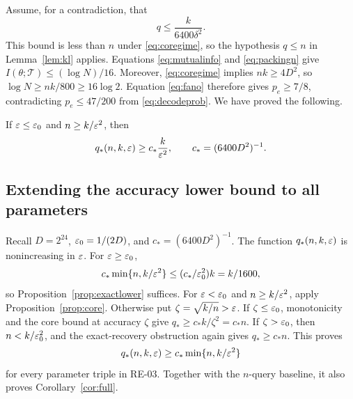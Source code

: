 Assume, for a contradiction, that
\begin{equation}\label{eq:qthreshold}
 q\le\frac{k}{6400\delta^2}.
\end{equation}
This bound is less than $n$ under \eqref{eq:coregime}, so the hypothesis
$q\le n$ in Lemma~\ref{lem:kl} applies. Equations \eqref{eq:mutualinfo} and
\eqref{eq:packingn} give $I(\theta;\mathcal T)\le(\log N)/16$.
Moreover, \eqref{eq:coregime} implies
$nk\ge4D^2$, so $\log N\ge nk/800\ge16\log2$.
Equation \eqref{eq:fano} therefore gives $p_e\ge7/8$, contradicting
$p_e\le47/200$ from \eqref{eq:decodeprob}. We have proved the following.

\begin{proposition}\label{prop:core}
If $\varepsilon\le\varepsilon_0$ and $n\ge k/\varepsilon^2$, then
\begin{equation}\label{eq:corelower}
 q_*(n,k,\varepsilon)\ge c_*\frac{k}{\varepsilon^2},\qquad c_*=(6400D^2)^{-1}.
\end{equation}
\end{proposition}


\subsection{Extending the accuracy lower bound to all parameters}

Recall $D=2^{24}$, $\varepsilon_0=1/(2D)$, and $c_*=(6400D^2)^{-1}$.
The function $q_*(n,k,\varepsilon)$ is nonincreasing in $\varepsilon$.
For $\varepsilon\ge\varepsilon_0$,
\[
 c_*\min\{n,k/\varepsilon^2\}\le(c_*/\varepsilon_0^2)k=k/1600,
\]
so Proposition~\ref{prop:exactlower} suffices.
For $\varepsilon<\varepsilon_0$ and $n\ge k/\varepsilon^2$, apply Proposition~\ref{prop:core}.
Otherwise put $\zeta=\sqrt{k/n}>\varepsilon$. If $\zeta\le\varepsilon_0$, monotonicity
and the core bound at accuracy $\zeta$ give $q_*\ge c_*k/\zeta^2=c_*n$.
If $\zeta>\varepsilon_0$, then $n<k/\varepsilon_0^2$, and the exact-recovery obstruction
again gives $q_*\ge c_*n$. This proves
\[
 q_*(n,k,\varepsilon)\ge c_*\min\{n,k/\varepsilon^2\}
\]
for every parameter triple in RE-03. Together with the $n$-query baseline,
it also proves Corollary~\ref{cor:full}.
